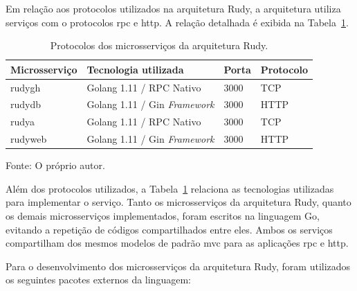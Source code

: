 Em relação aos protocolos utilizados na arquitetura Rudy, a arquitetura utiliza serviços com o protocolos \ac{rpc} e \ac{http}.
%
A relação detalhada é exibida na Tabela~\ref{tab:protocolos_rudy}.



\begin{table}[htb!]
    \centering
    \caption{Protocolos dos microsserviços da arquitetura Rudy.}
    \label{tab:protocolos_rudy}
    \begin{tabular}{|l|l|l|l|}
    \hline
    Microsserviço & Tecnologia utilizada                 & Porta & Protocolo \\ \hline
    rudygh        & Golang 1.11 / RPC Nativo             & 3000  & TCP       \\ \hline
    rudydb        & Golang 1.11 / Gin \textit{Framework} & 3000  & HTTP      \\ \hline
    rudya         & Golang 1.11 / RPC Nativo             & 3000  & TCP       \\ \hline
    rudyweb       & Golang 1.11 / Gin \textit{Framework} & 3000  & HTTP      \\ \hline
    \end{tabular}
    
    Fonte: O próprio autor.
\end{table}


Além dos protocolos utilizados, a Tabela~\ref{tab:protocolos_rudy} relaciona as tecnologias utilizadas para implementar o serviço.
%
Tanto os microsserviços da arquitetura Rudy, quanto os demais microsserviços implementados, foram escritos na linguagem Go, evitando a repetição de códigos compartilhados entre eles.
%
Ambos os serviços compartilham dos mesmos modelos de padrão \ac{mvc} para as aplicações \ac{rpc} e \ac{http}.

Para o desenvolvimento dos microsserviços da arquitetura Rudy, foram utilizados os seguintes pacotes externos da linguagem:

